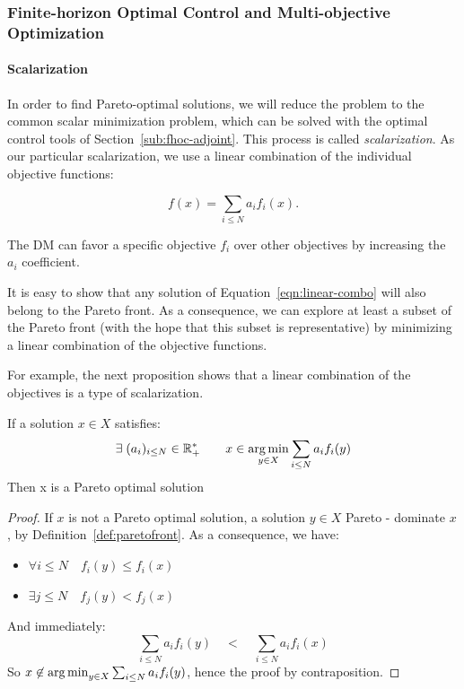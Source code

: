 			
		\subsubsection{Finite-horizon Optimal Control and Multi-objective Optimization}
			\paragraph{Scalarization}
In order to find Pareto-optimal solutions, we will reduce the problem to the common scalar minimization problem, which can be solved with the optimal control tools of Section~\ref{sub:fhoc-adjoint}. This process is called \emph{scalarization}. As our particular scalarization, we use a linear combination of the individual objective functions:

\begin{equation}
\label{eqn:linear-combo}
f(x) = \sum_{i \leq N} a_i f_i(x).
\end{equation}

The DM can favor a specific objective $f_i$ over other objectives by increasing the $a_i$ coefficient.

It is easy to show that any solution of Equation~\eqref{eqn:linear-combo} will also belong to the Pareto front. As a consequence, we can explore at least a subset of the Pareto front (with the hope that this subset is representative) by minimizing a linear combination of the objective functions.


For example, the next proposition shows that a linear combination of the objectives is a type of scalarization.
\begin{proposition}
\label{prop:scalarization}
	If a solution $x \in X$ satisfies: 
	\begin{equation}\label{eq:linear_combination}
		\exists \; (a_i)_{i\leq N} \in \mathbb{R}_{+}^*\qquad x \in \operatorname*{arg\,min}_{y \in X} \sum_{i \leq N} a_i f_i(y)
	\end{equation}
	Then x is a Pareto optimal solution
\end{proposition}
\begin{proof}
	If $x$ is not a Pareto optimal solution, a solution $y \in X$  Pareto - dominate $x$, by Definition~\ref{def:paretofront}. As a consequence, we have:
	\begin{itemize}
			\item $\forall i \leq N \quad f_i(y) \leq f_i(x)$
			\item $\exists j \leq N \quad f_j(y) < f_j(x)$
	\end{itemize}
	And immediately:
	\begin{equation*}
		\sum_{i \leq N} a_i f_i(y) \quad < \quad \sum_{i \leq N} a_i f_i(x)
	\end{equation*}
	So $x \not \in \operatorname*{arg\,min}_{y \in X} \sum_{i \leq N} a_i f_i(y)$, hence the proof by contraposition.
\end{proof}

